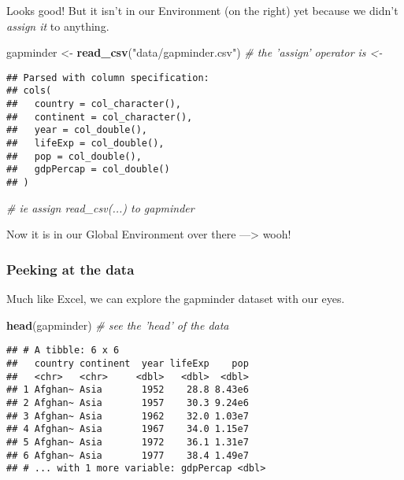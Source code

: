 \documentclass[]{tufte-handout}
\newenvironment{Shaded}{}{}
\newcommand{\CommentTok}[1]{\textcolor[rgb]{0.38,0.63,0.69}{\textit{#1}}}
\newcommand{\KeywordTok}[1]{\textcolor[rgb]{0.00,0.44,0.13}{\textbf{#1}}}
\newcommand{\NormalTok}[1]{#1}
\newcommand{\StringTok}[1]{\textcolor[rgb]{0.25,0.44,0.63}{#1}}
\begin{document}
Looks good! But it isn't in our Environment (on the right) yet because
we didn't \emph{assign it} to anything.

\begin{Shaded}
\begin{Highlighting}[]
\NormalTok{gapminder <-}\StringTok{ }\KeywordTok{read_csv}\NormalTok{(}\StringTok{"data/gapminder.csv"}\NormalTok{)  }\CommentTok{# the 'assign' operator is <-}
\end{Highlighting}
\end{Shaded}

\begin{verbatim}
## Parsed with column specification:
## cols(
##   country = col_character(),
##   continent = col_character(),
##   year = col_double(),
##   lifeExp = col_double(),
##   pop = col_double(),
##   gdpPercap = col_double()
## )
\end{verbatim}

\begin{Shaded}
\begin{Highlighting}[]
\CommentTok{# ie assign read_csv(...) to gapminder}
\end{Highlighting}
\end{Shaded}

Now it is in our Global Environment over there ---\textgreater{} wooh!

\hypertarget{peeking-at-the-data}{%
\subsubsection{Peeking at the data}\label{peeking-at-the-data}}

Much like Excel, we can explore the gapminder dataset with our eyes.

\begin{Shaded}
\begin{Highlighting}[]
\KeywordTok{head}\NormalTok{(gapminder)  }\CommentTok{# see the 'head' of the data}
\end{Highlighting}
\end{Shaded}

\begin{verbatim}
## # A tibble: 6 x 6
##   country continent  year lifeExp    pop
##   <chr>   <chr>     <dbl>   <dbl>  <dbl>
## 1 Afghan~ Asia       1952    28.8 8.43e6
## 2 Afghan~ Asia       1957    30.3 9.24e6
## 3 Afghan~ Asia       1962    32.0 1.03e7
## 4 Afghan~ Asia       1967    34.0 1.15e7
## 5 Afghan~ Asia       1972    36.1 1.31e7
## 6 Afghan~ Asia       1977    38.4 1.49e7
## # ... with 1 more variable: gdpPercap <dbl>
\end{verbatim}
\end{document}

